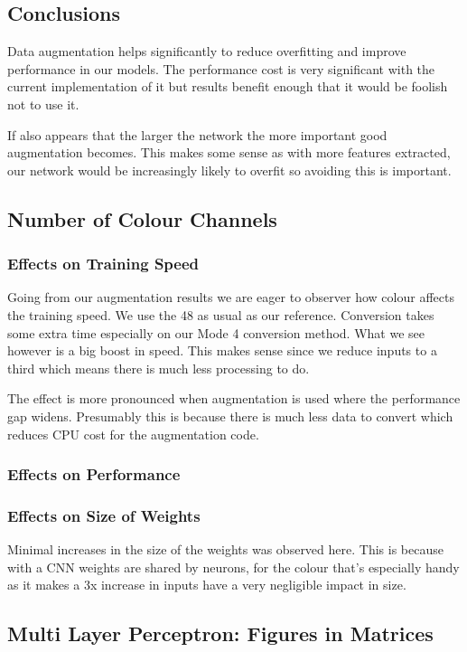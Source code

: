 \subsection{Conclusions}
Data augmentation helps significantly to reduce overfitting and improve performance in our models. The performance cost is very significant with the current implementation of it but results benefit enough that it would be foolish not to use it.

If also appears that the larger the network the more important good augmentation becomes. This makes some sense as with more features extracted, our network would be increasingly likely to overfit so avoiding this is important.

\subsection{Number of Colour Channels}
\subsubsection{Effects on Training Speed}
Going from our augmentation results we are eager to observer how colour affects the training speed. We use the 48 as usual as our reference. Conversion takes some extra time especially on our Mode 4 conversion method. What we see however is a big boost in speed. This makes sense since we reduce inputs to a third which means there is much less processing to do.

The effect is more pronounced when augmentation is used where the performance gap widens. Presumably this is because there is much less data to convert which reduces CPU cost for the augmentation code.
\subsubsection{Effects on Performance}
\subsubsection{Effects on Size of Weights}
Minimal increases in the size of the weights was observed here. This is because with a CNN weights are shared by neurons, for the colour that's especially handy as it makes a 3x increase in inputs have a very negligible impact in size.

\subsection{Multi Layer Perceptron: Figures in Matrices}


